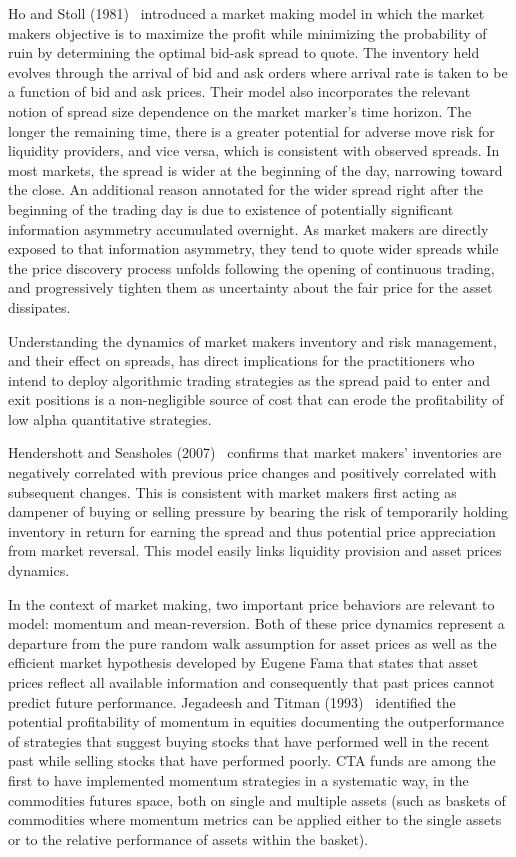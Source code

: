 Ho and Stoll (1981)~\cite{ho1981} introduced a market making model in which the market makers objective is to maximize the profit while minimizing the probability of ruin by determining the optimal bid-ask spread to quote. The inventory held evolves through the arrival of bid and ask orders where arrival rate is taken to be a function of bid and ask prices. Their model also incorporates the relevant notion of spread size dependence on the market marker's time horizon. The longer the remaining time, there is a greater potential for adverse move risk for liquidity providers, and vice versa, which is consistent with observed spreads. In most markets, the spread is wider at the beginning of the day, narrowing toward the close. An additional reason annotated for the wider spread right after the beginning of the trading day is due to existence of potentially significant information asymmetry accumulated overnight. As market makers are directly exposed to that information asymmetry, they tend to quote wider spreads while the price discovery process unfolds following the opening of continuous trading, and progressively tighten them as uncertainty about the fair price for the asset dissipates.


Understanding the dynamics of market makers inventory and risk management, and their effect on spreads, has direct implications for the practitioners who intend to deploy algorithmic trading strategies as the spread paid to enter and exit positions is a non-negligible source of cost that can erode the profitability of low alpha quantitative strategies. 


Hendershott and Seasholes (2007)~\cite{hendersea} confirms that market makers' inventories are negatively correlated with previous price changes and positively correlated with subsequent changes. This is consistent with market makers first acting as dampener of buying or selling pressure by bearing the risk of temporarily holding inventory in return for earning the spread and thus potential price appreciation from market reversal. This model easily links liquidity provision and asset prices dynamics. 


In the context of market making, two important price behaviors are relevant to model: momentum and mean-reversion. Both of these price dynamics represent a departure from the pure random walk assumption for asset prices as well as the efficient market hypothesis developed by Eugene Fama that states that asset prices reflect all available information and consequently that past prices cannot predict future performance. Jegadeesh and Titman (1993)~\cite{JeTit1993} identified the potential profitability of momentum in equities documenting the outperformance of strategies that suggest buying stocks that have performed well in the recent past while selling stocks that have performed poorly. CTA funds are among the first to have implemented momentum strategies in a systematic way, in the commodities futures space, both on single and multiple assets (such as baskets of commodities where momentum metrics can be applied either to the single assets or to the relative performance of assets within the basket). 


